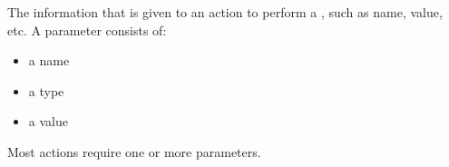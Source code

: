 \item[Parameters]{
The information that is given to an action to perform a \gdstep{}, such as
 name, value, etc.
A parameter consists of:
\begin{itemize}
\item a name
\item a type 
\item a value
\end{itemize}
Most actions require one or more parameters.
}
